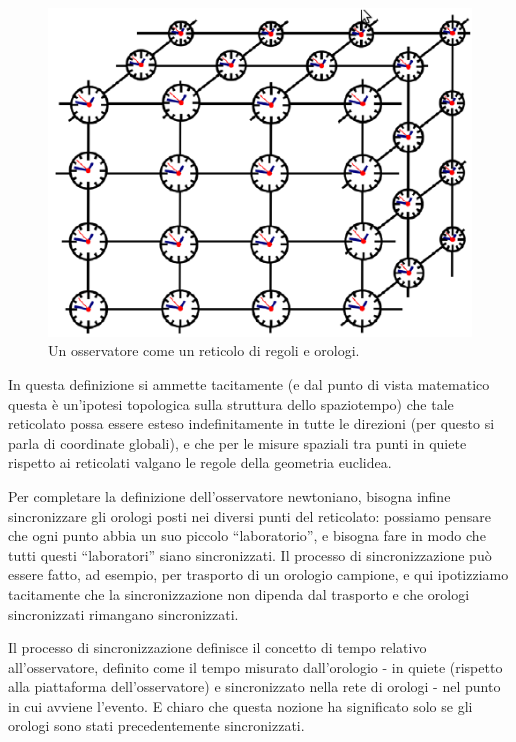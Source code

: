 \begin{figure}[htbp]
  \centering
  \includegraphics[scale=0.5]{immagini/galileo/oss_newton}
  \caption{Un osservatore come un reticolo di regoli e orologi.}
\end{figure}

In questa definizione si ammette tacitamente (e dal punto di vista matematico questa 
è un’ipotesi topologica sulla struttura dello spaziotempo) che tale reticolato possa 
essere esteso indefinitamente in tutte le direzioni (per questo si parla di coordinate globali), 
e che per le misure spaziali tra punti in quiete rispetto ai reticolati valgano le regole della geometria euclidea.

Per completare la definizione dell’osservatore newtoniano, bisogna infine
sincronizzare gli orologi posti nei diversi punti del reticolato: possiamo pensare 
che ogni punto abbia un suo piccolo ``laboratorio'', e bisogna fare in
modo che tutti questi ``laboratori'' siano sincronizzati. 
Il processo di sincronizzazione può essere fatto, ad esempio, per trasporto di un orologio campione,
e qui ipotizziamo tacitamente che la sincronizzazione non dipenda dal
trasporto e che orologi sincronizzati rimangano sincronizzati.

Il processo di sincronizzazione definisce il concetto di tempo relativo
all’osservatore, definito come il tempo misurato dall’orologio - in quiete
(rispetto alla piattaforma dell’osservatore) e sincronizzato nella rete di orologi
- nel punto in cui avviene l’evento. E chiaro che questa nozione ha significato
solo se gli orologi sono stati precedentemente sincronizzati.

